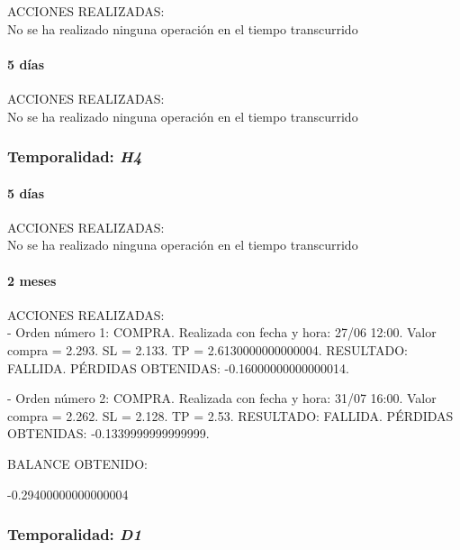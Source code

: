 ACCIONES REALIZADAS:\\

No se ha realizado ninguna operación en el tiempo transcurrido

\paragraph{5 días}

ACCIONES REALIZADAS:\\

No se ha realizado ninguna operación en el tiempo transcurrido

\subsubsection{Temporalidad: \textit{H4}}

\paragraph{5 días}

ACCIONES REALIZADAS:\\

No se ha realizado ninguna operación en el tiempo transcurrido

\paragraph{2 meses}

ACCIONES REALIZADAS:\\

- Orden número 1: COMPRA. Realizada con fecha y hora: 27/06 12:00. Valor compra = 2.293. SL = 2.133. TP = 2.6130000000000004. RESULTADO: FALLIDA. PÉRDIDAS OBTENIDAS: -0.16000000000000014.\newline

- Orden número 2: COMPRA. Realizada con fecha y hora: 31/07 16:00. Valor compra = 2.262. SL = 2.128. TP = 2.53. RESULTADO: FALLIDA. PÉRDIDAS OBTENIDAS: -0.1339999999999999.\newline


\color{blue}
BALANCE OBTENIDO:\newline

-0.29400000000000004\newline
\color{black}

\subsubsection{Temporalidad: \textit{D1}}


